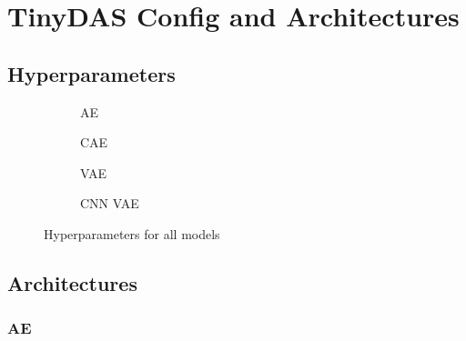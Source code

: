 \chapter{TinyDAS Config and Architectures}
\label{app:configs}

\section{Hyperparameters}

\begin{figure}[h]
  \begin{subfigure}[t]{.45\textwidth}
    \centering
    
    \caption{AE}
  \end{subfigure}
  \hfill
  \begin{subfigure}[t]{.45\textwidth}
    \centering
    
    \caption{CAE}
  \end{subfigure}

  \medskip

  \begin{subfigure}[t]{.45\textwidth}
    \centering
    
    \caption{VAE}
  \end{subfigure}
  \hfill
  \begin{subfigure}[t]{.45\textwidth}
    \centering
    
    \caption{CNN VAE}
  \end{subfigure}
    \caption{Hyperparameters for all models}
\end{figure}

\section{Architectures}
\label{app:archs}

\subsection{AE}
\label{app:a-ae}

